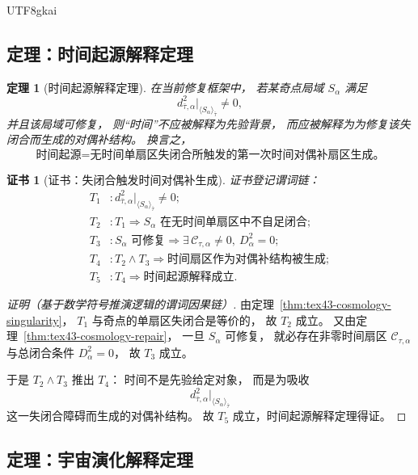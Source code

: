 \documentclass[12pt]{article}
\newtheorem{theorem}{定理}[section]
\newtheorem{Certificate}{证书}[section]
\begin{document}
\begin{CJK*}{UTF8}{gkai}
\subsection{定理：时间起源解释定理}
\label{subsec:tex43-ch10-theorem-time-origin}

\begin{theorem}[时间起源解释定理]
\label{thm:tex43-time-origin-explanation}
在当前修复框架中，
若某奇点局域 $S_\alpha$ 满足
\[
  d_{\bar\tau,\alpha}^2\big|_{\langle S_\alpha\rangle_{\bar\tau}}\neq 0,
\]
并且该局域可修复，
则“时间”不应被解释为先验背景，
而应被解释为为修复该失闭合而生成的对偶补结构。
换言之，
\[
  \boxed{
    \text{时间起源}
    =
    \text{无时间单扇区失闭合所触发的第一次时间对偶补扇区生成。}
  }
\]
\end{theorem}

\begin{Certificate}[证书：失闭合触发时间对偶补生成]
\label{cert:tex43-time-origin-explanation}
证书登记谓词链：
\[
\begin{aligned}
  T_1 &: d_{\bar\tau,\alpha}^2\big|_{\langle S_\alpha\rangle_{\bar\tau}}\neq 0;\\
  T_2 &: T_1 \Rightarrow S_\alpha\text{ 在无时间单扇区中不自足闭合};\\
  T_3 &: S_\alpha\text{ 可修复}
         \Rightarrow
         \exists\,\mathcal C_{\tau,\alpha}\neq 0,\ D_\alpha^2=0;\\
  T_4 &: T_2\wedge T_3
         \Rightarrow
         \text{时间扇区作为对偶补结构被生成};\\
  T_5 &: T_4 \Rightarrow \text{时间起源解释成立}.
\end{aligned}
\]
\end{Certificate}

\begin{proof}[证明（基于数学符号推演逻辑的谓词因果链）]
由定理~\ref{thm:tex43-cosmology-singularity}，
$T_1$ 与奇点的单扇区失闭合是等价的，
故 $T_2$ 成立。
又由定理~\ref{thm:tex43-cosmology-repair}，
一旦 $S_\alpha$ 可修复，
就必存在非零时间扇区 $\mathcal C_{\tau,\alpha}$ 与总闭合条件 $D_\alpha^2=0$，
故 $T_3$ 成立。

于是 $T_2\wedge T_3$ 推出 $T_4$：
时间不是先验给定对象，
而是为吸收
\[
  d_{\bar\tau,\alpha}^2\big|_{\langle S_\alpha\rangle_{\bar\tau}}
\]
这一失闭合障碍而生成的对偶补结构。
故 $T_5$ 成立，时间起源解释定理得证。
\end{proof}

\subsection{定理：宇宙演化解释定理}
\label{subsec:tex43-ch10-theorem-evolution}


\end{CJK*}
\end{document}
